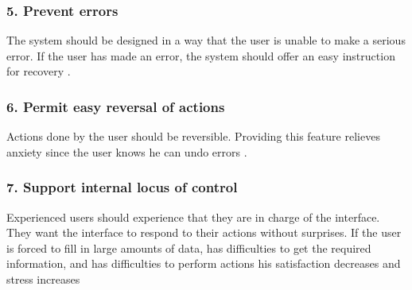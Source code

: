 \subsubsection{5. Prevent errors}
The system should be designed in a way that the user is unable to make a serious error. If the user has made an error, the system should offer an easy instruction for recovery \cite{schneiderman}.

\subsubsection{6. Permit easy reversal of actions}
Actions done by the user should be reversible. Providing this feature relieves anxiety since the user knows he can undo errors \cite{schneiderman}.

\subsubsection{7. Support internal locus of control}
Experienced users should experience that they are in charge of the interface. They want the interface to respond to their actions without surprises. If the user is forced to fill in large amounts of data, has difficulties to get the required information, and has difficulties to perform actions his satisfaction decreases and stress increases \cite{schneiderman}